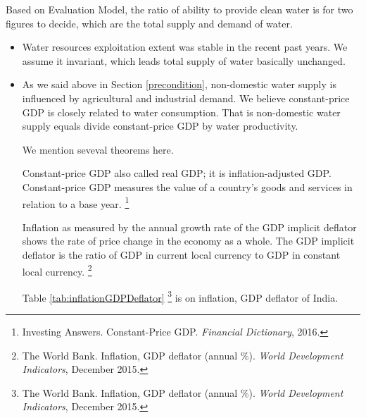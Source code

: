 \documentclass[tcn = 45538, sheet = true, abstract = true]{mcmthesis}
\begin{document}
\hspace{1.5 em} Based on Evaluation Model, 
the ratio of ability to provide clean water is for two figures to decide, 
which are the total supply and demand of water. 

\begin{itemize}

\item Water resources exploitation extent was stable in the recent past years. 
We assume it invariant, 
which leads total supply of water basically unchanged. 

\item As we said above in Section \ref{precondition}, 
non-domestic water supply is influenced by agricultural and industrial demand. 
We believe constant-price GDP is closely related to water consumption. 
That is non-domestic water supply equals divide constant-price GDP by water productivity. 

We mention seveval theorems here. 

\begin{Theorem}
Constant-price GDP also called real GDP; 
it is inflation-adjusted GDP. 
Constant-price GDP measures the value of a country's goods and services in relation to a base year. 
\footnote{Investing Answers. 
Constant-Price GDP. 
\emph{Financial Dictionary}, 
2016.}
\label{thm:constantPriceGDP}
\end{Theorem}

\begin{Theorem}
Inflation as measured by the annual growth rate of the GDP implicit deflator shows the rate of price change in the economy as a whole. 
The GDP implicit deflator is the ratio of GDP in current local currency to GDP in constant local currency.
\footnote{The World Bank. 
Inflation, GDP deflator (annual \%). 
\emph{World Development Indicators}, 
December 2015.}
\label{thm:inflationGDPDeflator}
\end{Theorem}

Table \ref{tab:inflationGDPDeflator}
\footnote{The World Bank. 
Inflation, GDP deflator (annual \%). 
\emph{World Development Indicators}, 
December 2015.}
is on inflation, 
GDP deflator of India.


\end{itemize}
\end{document}
